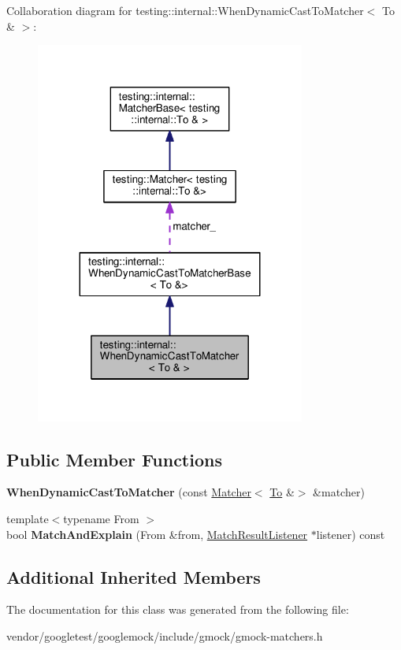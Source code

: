 Collaboration diagram for testing\+:\+:internal\+:\+:When\+Dynamic\+Cast\+To\+Matcher$<$ To \& $>$\+:
\nopagebreak
\begin{figure}[H]
\begin{center}
\leavevmode
\includegraphics[width=251pt]{classtesting_1_1internal_1_1_when_dynamic_cast_to_matcher_3_01_to_01_6_01_4__coll__graph}
\end{center}
\end{figure}
\subsection*{Public Member Functions}
\begin{DoxyCompactItemize}
\item 
\mbox{\label{classtesting_1_1internal_1_1_when_dynamic_cast_to_matcher_3_01_to_01_6_01_4_a1ba7bc63566075d2afe18905e5c7ad76}} 
{\bfseries When\+Dynamic\+Cast\+To\+Matcher} (const \mbox{\hyperlink{classtesting_1_1_matcher}{Matcher}}$<$ \mbox{\hyperlink{classtesting_1_1internal_1_1_to}{To}} \&$>$ \&matcher)
\item 
\mbox{\label{classtesting_1_1internal_1_1_when_dynamic_cast_to_matcher_3_01_to_01_6_01_4_a1eb76a60d0943519623f438b29f70a5f}} 
{\footnotesize template$<$typename From $>$ }\\bool {\bfseries Match\+And\+Explain} (From \&from, \mbox{\hyperlink{classtesting_1_1_match_result_listener}{Match\+Result\+Listener}} $\ast$listener) const
\end{DoxyCompactItemize}
\subsection*{Additional Inherited Members}


The documentation for this class was generated from the following file\+:\begin{DoxyCompactItemize}
\item 
vendor/googletest/googlemock/include/gmock/gmock-\/matchers.\+h\end{DoxyCompactItemize}
